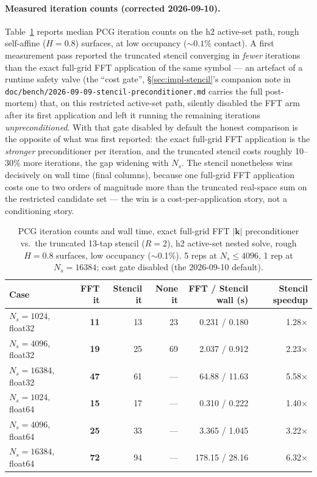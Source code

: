 \documentclass[11pt,a4paper]{article}
\begin{document}
\paragraph{Measured iteration counts (corrected 2026-09-10).}
Table~\ref{tab:stencil} reports median PCG iteration counts on the h2
active-set path, rough self-affine ($H=0.8$) surfaces, at low occupancy
($\sim 0.1\%$ contact). A first measurement pass reported the truncated
stencil converging in \emph{fewer} iterations than the exact full-grid FFT
application of the same symbol — an artefact of a runtime safety valve (the
``cost gate'', \S\ref{sec:impl-stencil}'s companion note in
\texttt{doc/bench/2026-09-09-stencil-preconditioner.md} carries the full
post-mortem) that, on this restricted active-set path, silently disabled the
FFT arm after its first application and left it running the remaining
iterations \emph{unpreconditioned}. With that gate disabled by default the
honest comparison is the opposite of what was first reported: the exact
full-grid FFT application is the \emph{stronger} preconditioner per
iteration, and the truncated stencil costs roughly 10--30\% more iterations,
the gap widening with $N_s$. The stencil nonetheless wins decisively on wall
time (final columns), because one full-grid FFT application costs one to two
orders of magnitude more than the truncated real-space sum on the restricted
candidate set — the win is a cost-per-application story, not a
conditioning story.

\begin{table}[ht]
\centering
\caption{PCG iteration counts and wall time, exact full-grid FFT
         $|\mathbf k|$ preconditioner vs.\ the truncated 13-tap stencil
         ($R=2$), h2 active-set nested solve, rough $H{=}0.8$ surfaces, low
         occupancy ($\sim$0.1\%). 5 reps at $N_s\le4096$, 1 rep at
         $N_s=16384$; cost gate disabled (the 2026-09-10 default).}
\label{tab:stencil}
\begin{tabular}{@{}lrrrrr@{}}
\toprule
Case & FFT it & Stencil it & None it & FFT / Stencil wall (s) & Stencil speedup \\
\midrule
$N_s{=}1024$, float32  & \textbf{11} & 13 & 23 & 0.231 / 0.180 & 1.28$\times$ \\
$N_s{=}4096$, float32  & \textbf{19} & 25 & 69 & 2.037 / 0.912 & 2.23$\times$ \\
$N_s{=}16384$, float32 & \textbf{47} & 61 & --- & 64.88 / 11.63 & 5.58$\times$ \\
$N_s{=}1024$, float64  & \textbf{15} & 17 & --- & 0.310 / 0.222 & 1.40$\times$ \\
$N_s{=}4096$, float64  & \textbf{25} & 33 & --- & 3.365 / 1.045 & 3.22$\times$ \\
$N_s{=}16384$, float64 & \textbf{72} & 94 & --- & 178.15 / 28.16 & 6.32$\times$ \\
\bottomrule
\end{tabular}
\end{table}
\end{document}
